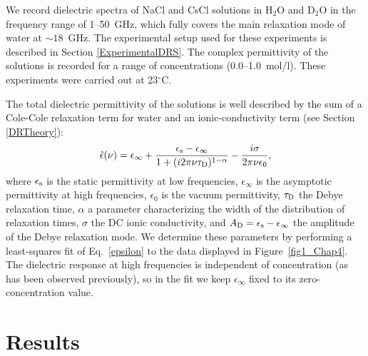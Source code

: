 We record dielectric spectra of NaCl and CsCl solutions in H$_2$O and D$_2$O in the frequency range of 1--50~GHz, which fully covers the main relaxation mode of water at $\sim$$18$~GHz.\!\cite{Ellison1996} The experimental setup used for these experiments is described in Section \ref{ExperimentalDRS}. The complex permittivity of the solutions is recorded for a range of concentrations (0.0--1.0~mol/l). These experiments were carried out at 23$^\circ$C.




The total dielectric permittivity of the solutions is well described by the sum of a Cole-Cole relaxation term for water and an ionic-conductivity term (see Section \ref{DRTheory}):
\begin{eqnarray}
\hat{\epsilon}(\nu) = \epsilon_{\infty} + \frac{\epsilon_{\rm s} - \epsilon_{\infty}}{1 + (i 2 \pi \nu \tau_{\rm D})^{1-\alpha}} - \frac{i \sigma}{2 \pi \nu \epsilon_0},
\label{epsilon}
\end{eqnarray}
where $\epsilon_{\rm s}$ is the static permittivity at low frequencies, $\epsilon_{\infty}$ is the asymptotic permittivity at high frequencies, $\epsilon_0$ is the vacuum permittivity, $\tau_{\rm D}$ the Debye relaxation time, $\alpha$ a parameter characterizing the width of the distribution of relaxation times, $\sigma$ the DC ionic conductivity, and $A_\text{D} = \epsilon_{\rm s} - \epsilon_{\infty}$ the amplitude of the Debye relaxation mode. We determine these parameters by performing a least-squares fit of Eq.\ \ref{epsilon} to the data displayed in Figure~\ref{fig1_Chap4}. The dielectric response at high frequencies is independent of concentration (as has been observed previously\!\cite{Hall1981,Lileev2007,Ottosson2014c}), so in the fit we keep $\epsilon_{\infty}$ fixed to its zero-concentration value. 






\section{Results}



